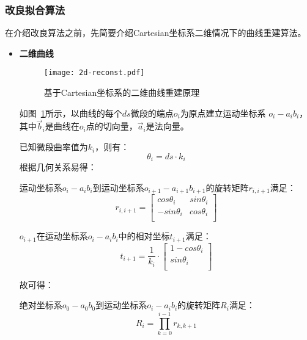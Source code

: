 \subsubsection{改良拟合算法}

在介绍改良算法之前，先简要介绍Cartesian坐标系二维情况下的曲线重建算法。

\begin{itemize}

\item \textbf{二维曲线} \\

\FloatBarrier
\begin{figure}
\centering
\texttt{[image: 2d-reconst.pdf]}
\caption{基于Cartesian坐标系的二维曲线重建原理}
\label{fig:2d-reconst} 
\end{figure}
\FloatBarrier

如图~\ref{fig:2d-reconst}所示，以曲线的每个$ds$微段的端点$o_i$为原点建立运动坐标系 $o_i-a_ib_i$，
其中$\vec b_i$是曲线在$o_i$点的切向量，$\vec a_i$是法向量。

已知微段曲率值为$k_i$，则有：
\begin{equation}
\theta_i = ds\cdot k_i
\end{equation}
根据几何关系易得：

运动坐标系$o_i-a_ib_i$到运动坐标系$o_{i+1}-a_{i+1}b_{i+1}$的旋转矩阵$r_{i, i+1}$满足：
    \begin{equation}
    r_{i, i+1} = \left[
      \begin{matrix}
      cos \theta_i & sin \theta_i\\
      -sin \theta_i & cos \theta_i\\
      \end{matrix}
    \right]
    \end{equation}
    
$o_{i+1}$在运动坐标系$o_i-a_ib_i$中的相对坐标$t_{i+1}$满足：
    \begin{equation}
    t_{i+1} = \frac{1}{k_i} \cdot \left[
      \begin{matrix}
    	1 - cos\theta_i\\
      sin\theta_i\\
      \end{matrix}
    \right]
    \end{equation}
    

故可得：

绝对坐标系$o_0-a_0b_0$到运动坐标系$o_i-a_ib_i$的旋转矩阵$R_i$满足：
    \begin{equation}
    R_i = \prod_{k = 0}^{i-1} r_{k, k+1}
    \end{equation}


\end{itemize}
